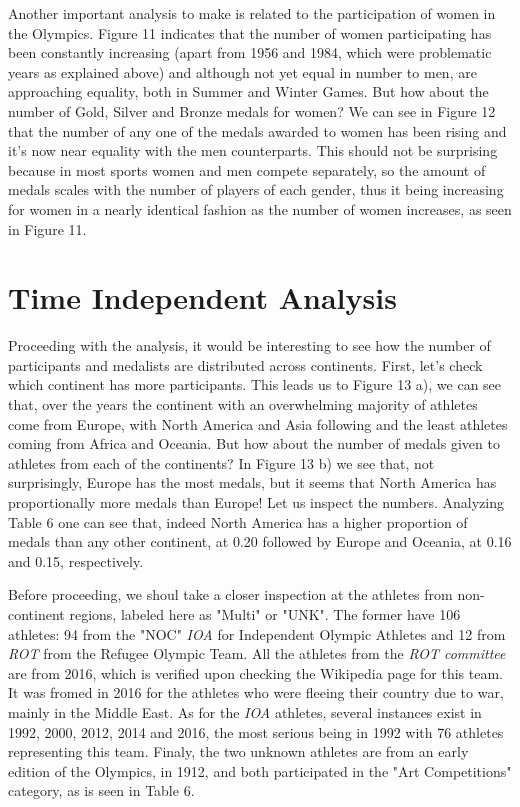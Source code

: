 \documentclass[11pt]{article} %
\begin{document}
Another important analysis to make is related to the participation of women in the Olympics. Figure 11 indicates that the number of women participating has been constantly increasing (apart from 1956 and 1984, which were problematic years as explained above) and although not yet equal in number to men, are approaching equality, both in Summer and Winter Games. But how about the number of Gold, Silver and Bronze medals for women? We can see in Figure 12 that the number of any one of the medals awarded to women has been rising and it's now near equality with the men counterparts. This should not be surprising because in most sports women and men compete separately, so the amount of medals scales with the number of players of each gender, thus it being increasing for women in a nearly identical fashion as the number of women increases, as seen in Figure 11. 

\section{Time Independent Analysis}

Proceeding with the analysis, it would be interesting to see how the number of participants and medalists are distributed across continents. First, let's check which continent has more participants. This leads us to Figure 13 a), we can see that, over the years the continent with an overwhelming majority of athletes come from Europe, with North America and Asia following and the least athletes coming from Africa and Oceania. But how about the number of medals given to athletes from each of the continents? In Figure 13 b) we see that, not surprisingly, Europe has the most medals, but it seems that North America has proportionally more medals than Europe! Let us inspect the numbers. Analyzing Table 6 one can see that, indeed North America has a higher proportion of medals than any other continent, at 0.20 followed by Europe and Oceania, at 0.16 and 0.15, respectively.

Before proceeding, we shoul take a closer inspection at the athletes from non-continent regions, labeled here as "Multi" or "UNK". The former have 106 athletes: 94 from the "NOC" {\it IOA} for  Independent Olympic Athletes and 12 from {\it ROT} from the Refugee Olympic Team. All the athletes from the {\it ROT committee} are from 2016, which is verified upon checking the Wikipedia page for this team. It was fromed in 2016 for the athletes who were fleeing their country due to war, mainly in the Middle East. As for the {\it IOA} athletes, several instances exist in 1992, 2000, 2012, 2014 and 2016, the most serious being in 1992 with 76 athletes representing this team. Finaly, the two unknown athletes are from an early edition of the Olympics, in 1912, and both participated in the "Art Competitions" category, as is seen in Table 6.
\end{document}
